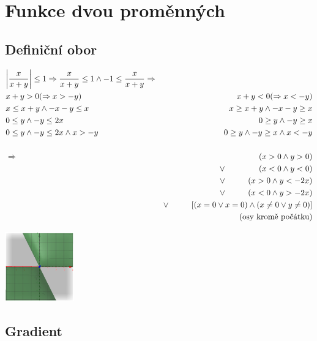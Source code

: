 \documentclass[a4paper]{article}
\newcommand{\tab}{\hspace{1cm}}
\begin{document}
\text{}\vspace{-0.1cm}
{\fontsize{12}{15}\selectfont \hspace{-0.5cm}}

\section{Funkce dvou proměnných}
\subsection{Definiční obor}
\begin{align*}
	& \bigg| \frac{x}{x+y} \bigg| \le 1 \Rightarrow \frac{x}{x+y} \le 1 \wedge -1 \le \frac{x}{x+y} \Rightarrow \\
	& x+y > 0 (\Rightarrow x > -y) & x+y < 0 (\Rightarrow x < -y) \\
	& x \le x+y \wedge -x-y \le x & x \ge x+y \wedge -x-y \ge x \\
	& 0 \le y \wedge -y \le 2x & 0 \ge y \wedge -y \ge x \\
	& 0 \le y \wedge -y \le 2x \wedge  x > -y & 0 \ge y \wedge -y \ge x \wedge x < -y \\
	&& \\
	& \Rightarrow & (x > 0 \wedge y > 0) \\
	&& \vee \tab \hspace{0.48cm} (x < 0 \wedge y < 0) \\
	&& \vee \tab (x > 0 \wedge y < -2x) \\
	&& \vee \tab (x < 0 \wedge y > -2x) \\
	&& \vee \tab [(x = 0 \vee x = 0) \wedge (x \ne 0 \vee y \ne 0)] \\
	&& (\text{osy kromě počátku}) \\
\end{align*}

\vspace{-2.4cm}\hspace*{2.2cm}\includegraphics[width=3cm]{double_fun}

\subsection{Gradient}
\end{document}
